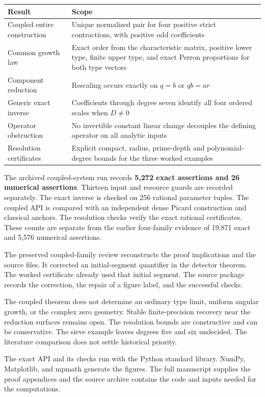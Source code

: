 \renewcommand{\arraystretch}{1.28}
\begin{tabular}{@{}P{.28\linewidth}P{.65\linewidth}@{}}
\toprule
Result & Scope\\\midrule
Coupled entire construction & Unique normalized pair for four positive strict contractions, with positive odd coefficients\\
Common growth law & Exact order from the characteristic matrix, positive lower type, finite upper type, and exact Perron proportions for both type vectors\\
Component reduction & Rescaling occurs exactly on $q=b$ or $qb=ar$\\
Generic exact inverse & Coefficients through degree seven identify all four ordered scales when $D\ne0$\\
Operator obstruction & No invertible constant linear change decouples the defining operator on all analytic inputs\\
Resolution certificates & Explicit compact, radius, prime-depth and polynomial-degree bounds for the three worked examples\\
\bottomrule
\end{tabular}

The archived coupled-system run records \textbf{5,272 exact assertions and 26 numerical
assertions}. Thirteen input and resource guards are recorded separately.
The exact inverse is checked on 256 rational parameter tuples. The coupled
API is compared with an independent dense Picard construction and classical
anchors. The resolution checks verify the exact rational certificates.
These counts are separate from the earlier four-family evidence of 19,871 exact
and 5,576 numerical assertions.

The preserved coupled-family review reconstructs the proof implications and
the source files. It corrected an initial-segment quantifier in the
detector theorem. The worked certificate already used that initial segment.
The source package records the correction, the repair of a figure label, and the successful checks.

The coupled theorem does not determine an ordinary type limit, uniform angular
growth, or the complex zero geometry. Stable finite-precision recovery near the
reduction surfaces remains open. The resolution bounds are constructive and
can be conservative. The sieve example leaves degrees five and six undecided.
The literature comparison does not settle historical priority.

The exact API and its checks run with the Python standard library. NumPy, Matplotlib, and
mpmath generate the figures. The full manuscript supplies the proof
appendices and the source archive contains the code and inputs needed for the computations.
